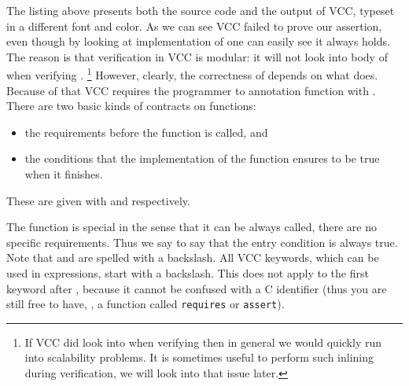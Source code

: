 
\noindent
The listing above presents both the source code and the output
of VCC, typeset in a different font and color.
As we can see VCC failed to prove our assertion,
even though by looking at implementation of 
one can easily see it always holds.
The reason is that verification in VCC is modular:
it will not look into body of  when
verifying .%
\footnote{
  If VCC did look into  when verifying 
  then in general we would quickly run into scalability problems.
  It is sometimes useful to perform such inlining during verification,
  we will look into that issue later.
}
However, clearly, the correctness of  depends on what 
does.
Because of that VCC requires the programmer to annotation function
with .
There are two basic kinds of contracts on functions:
\begin{itemize}
\item the requirements before the function is called, and
\item the conditions that the implementation of the function ensures to be true when it finishes.
\end{itemize}
These are given with  and  respectively.


\noindent
The function  is special in the sense that it can be always called,
there are no specific requirements.
Thus we say  to say that the entry condition is
always true.
Note that \vcc{\true} and \vcc{\result} are spelled with a backslash.
All VCC keywords, which can be used in expressions, start with a backslash.
This does not apply to the first keyword after , because it cannot
be confused with a C identifier (thus you are still free to have, \eg,
a function called \texttt{requires} or \texttt{assert}).


